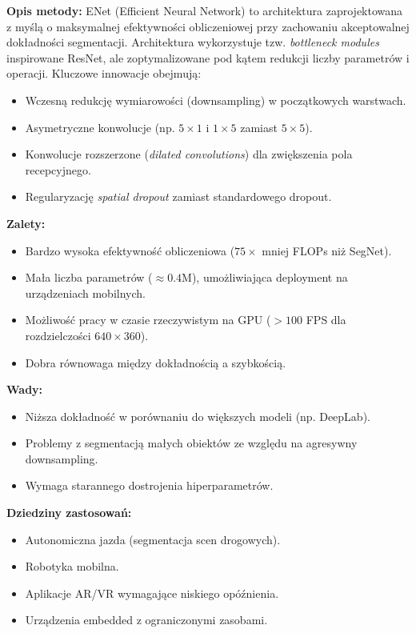 \textbf{Opis metody:}
ENet (Efficient Neural Network) to architektura zaprojektowana z myślą o maksymalnej efektywności obliczeniowej przy zachowaniu akceptowalnej dokładności segmentacji. Architektura wykorzystuje tzw. \textit{bottleneck modules} inspirowane ResNet, ale zoptymalizowane pod kątem redukcji liczby parametrów i operacji. Kluczowe innowacje obejmują:
\begin{itemize}
    \item Wczesną redukcję wymiarowości (downsampling) w początkowych warstwach.
    \item Asymetryczne konwolucje (np. $5\times1$ i $1\times5$ zamiast $5\times5$).
    \item Konwolucje rozszerzone (\textit{dilated convolutions}) dla zwiększenia pola recepcyjnego.
    \item Regularyzację \textit{spatial dropout} zamiast standardowego dropout.
\end{itemize}

\textbf{Zalety:}
\begin{itemize}
    \item Bardzo wysoka efektywność obliczeniowa ($75\times$ mniej FLOPs niż SegNet).
    \item Mała liczba parametrów ($\approx 0.4$M), umożliwiająca deployment na urządzeniach mobilnych.
    \item Możliwość pracy w czasie rzeczywistym na GPU ($>100$ FPS dla rozdzielczości $640\times360$).
    \item Dobra równowaga między dokładnością a szybkością.
\end{itemize}

\textbf{Wady:}
\begin{itemize}
    \item Niższa dokładność w porównaniu do większych modeli (np. DeepLab).
    \item Problemy z segmentacją małych obiektów ze względu na agresywny downsampling.
    \item Wymaga starannego dostrojenia hiperparametrów.
\end{itemize}

\textbf{Dziedziny zastosowań:}
\begin{itemize}
    \item Autonomiczna jazda (segmentacja scen drogowych).
    \item Robotyka mobilna.
    \item Aplikacje AR/VR wymagające niskiego opóźnienia.
    \item Urządzenia embedded z ograniczonymi zasobami.
\end{itemize}

